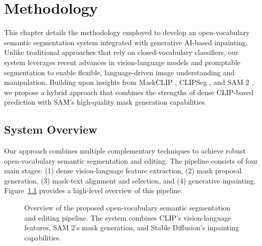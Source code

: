 \chapter{Methodology}
\label{ch:methodology}

This chapter details the methodology employed to develop an open-vocabulary semantic segmentation system integrated with generative AI-based inpainting. Unlike traditional approaches that rely on closed-vocabulary classifiers, our system leverages recent advances in vision-language models and promptable segmentation to enable flexible, language-driven image understanding and manipulation. Building upon insights from MaskCLIP \cite{zhou2022extract}, CLIPSeg \cite{luddecke2022clipseg}, and SAM 2 \cite{ravi2024sam2}, we propose a hybrid approach that combines the strengths of dense CLIP-based prediction with SAM's high-quality mask generation capabilities.

\section{System Overview}
Our approach combines multiple complementary techniques to achieve robust open-vocabulary semantic segmentation and editing. The pipeline consists of four main stages: (1) dense vision-language feature extraction, (2) mask proposal generation, (3) mask-text alignment and selection, and (4) generative inpainting. Figure~\ref{fig:system_pipeline} provides a high-level overview of this pipeline.

\begin{figure}[h]
\centering
{}
\caption{Overview of the proposed open-vocabulary semantic segmentation and editing pipeline. The system combines CLIP's vision-language features, SAM 2's mask generation, and Stable Diffusion's inpainting capabilities.}
\label{fig:system_pipeline}
\end{figure}


